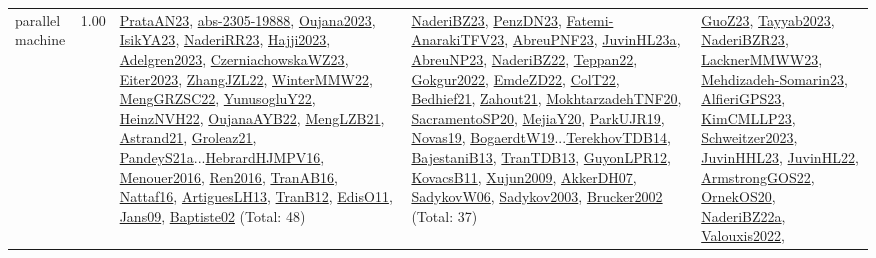 {\begin{longtable}{p{3cm}r>{\raggedright\arraybackslash}p{6cm}>{\raggedright\arraybackslash}p{6cm}>{\raggedright\arraybackslash}p{8cm}}
\index{parallel machine}\index{Classification!parallel machine}parallel machine &  1.00 & \hyperref[detail:PrataAN23]{PrataAN23}, \hyperref[detail:abs-2305-19888]{abs-2305-19888}, \hyperref[detail:Oujana2023]{Oujana2023}, \hyperref[detail:IsikYA23]{IsikYA23}, \hyperref[detail:NaderiRR23]{NaderiRR23}, \hyperref[detail:Hajji2023]{Hajji2023}, \hyperref[detail:Adelgren2023]{Adelgren2023}, \hyperref[detail:CzerniachowskaWZ23]{CzerniachowskaWZ23}, \hyperref[detail:Eiter2023]{Eiter2023}, \hyperref[detail:ZhangJZL22]{ZhangJZL22}, \hyperref[detail:WinterMMW22]{WinterMMW22}, \hyperref[detail:MengGRZSC22]{MengGRZSC22}, \hyperref[detail:YunusogluY22]{YunusogluY22}, \hyperref[detail:HeinzNVH22]{HeinzNVH22}, \hyperref[detail:OujanaAYB22]{OujanaAYB22}, \hyperref[detail:MengLZB21]{MengLZB21}, \hyperref[detail:Astrand21]{Astrand21}, \hyperref[detail:Groleaz21]{Groleaz21}, \hyperref[detail:PandeyS21a]{PandeyS21a}...\hyperref[detail:HebrardHJMPV16]{HebrardHJMPV16}, \hyperref[detail:Menouer2016]{Menouer2016}, \hyperref[detail:Ren2016]{Ren2016}, \hyperref[detail:TranAB16]{TranAB16}, \hyperref[detail:Nattaf16]{Nattaf16}, \hyperref[detail:ArtiguesLH13]{ArtiguesLH13}, \hyperref[detail:TranB12]{TranB12}, \hyperref[detail:EdisO11]{EdisO11}, \hyperref[detail:Jans09]{Jans09}, \hyperref[detail:Baptiste02]{Baptiste02} (Total: 48) & \hyperref[detail:NaderiBZ23]{NaderiBZ23}, \hyperref[detail:PenzDN23]{PenzDN23}, \hyperref[detail:Fatemi-AnarakiTFV23]{Fatemi-AnarakiTFV23}, \hyperref[detail:AbreuPNF23]{AbreuPNF23}, \hyperref[detail:JuvinHL23a]{JuvinHL23a}, \hyperref[detail:AbreuNP23]{AbreuNP23}, \hyperref[detail:NaderiBZ22]{NaderiBZ22}, \hyperref[detail:Teppan22]{Teppan22}, \hyperref[detail:Gokgur2022]{Gokgur2022}, \hyperref[detail:EmdeZD22]{EmdeZD22}, \hyperref[detail:ColT22]{ColT22}, \hyperref[detail:Bedhief21]{Bedhief21}, \hyperref[detail:Zahout21]{Zahout21}, \hyperref[detail:MokhtarzadehTNF20]{MokhtarzadehTNF20}, \hyperref[detail:SacramentoSP20]{SacramentoSP20}, \hyperref[detail:MejiaY20]{MejiaY20}, \hyperref[detail:ParkUJR19]{ParkUJR19}, \hyperref[detail:Novas19]{Novas19}, \hyperref[detail:BogaerdtW19]{BogaerdtW19}...\hyperref[detail:TerekhovTDB14]{TerekhovTDB14}, \hyperref[detail:BajestaniB13]{BajestaniB13}, \hyperref[detail:TranTDB13]{TranTDB13}, \hyperref[detail:GuyonLPR12]{GuyonLPR12}, \hyperref[detail:KovacsB11]{KovacsB11}, \hyperref[detail:Xujun2009]{Xujun2009}, \hyperref[detail:AkkerDH07]{AkkerDH07}, \hyperref[detail:SadykovW06]{SadykovW06}, \hyperref[detail:Sadykov2003]{Sadykov2003}, \hyperref[detail:Brucker2002]{Brucker2002} (Total: 37) & \hyperref[detail:GuoZ23]{GuoZ23}, \hyperref[detail:Tayyab2023]{Tayyab2023}, \hyperref[detail:NaderiBZR23]{NaderiBZR23}, \hyperref[detail:LacknerMMWW23]{LacknerMMWW23}, \hyperref[detail:Mehdizadeh-Somarin23]{Mehdizadeh-Somarin23}, \hyperref[detail:AlfieriGPS23]{AlfieriGPS23}, \hyperref[detail:KimCMLLP23]{KimCMLLP23}, \hyperref[detail:Schweitzer2023]{Schweitzer2023}, \hyperref[detail:JuvinHHL23]{JuvinHHL23}, \hyperref[detail:JuvinHL22]{JuvinHL22}, \hyperref[detail:ArmstrongGOS22]{ArmstrongGOS22}, \hyperref[detail:OrnekOS20]{OrnekOS20}, \hyperref[detail:NaderiBZ22a]{NaderiBZ22a}, \hyperref[detail:Valouxis2022]{Valouxis2022}, 
\end{longtable}}
